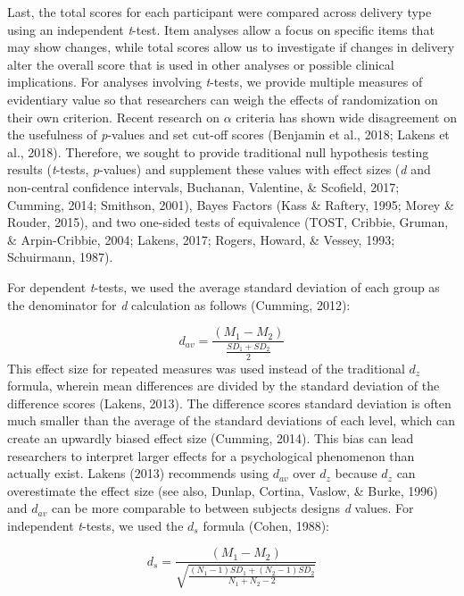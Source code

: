 \documentclass[english,man]{apa6}
\theoremstyle{definition}
\theoremstyle{definition}
\theoremstyle{definition}
\theoremstyle{remark}
\begin{document}
Last, the total scores for each participant were compared across
delivery type using an independent \emph{t}-test. Item analyses allow a
focus on specific items that may show changes, while total scores allow
us to investigate if changes in delivery alter the overall score that is
used in other analyses or possible clinical implications. For analyses
involving \emph{t}-tests, we provide multiple measures of evidentiary
value so that researchers can weigh the effects of randomization on
their own criterion. Recent research on \(\alpha\) criteria has shown
wide disagreement on the usefulness of \emph{p}-values and set cut-off
scores (Benjamin et al., 2018; Lakens et al., 2018). Therefore, we
sought to provide traditional null hypothesis testing results
(\emph{t}-tests, \emph{p}-values) and supplement these values with
effect sizes (\emph{d} and non-central confidence intervals, Buchanan,
Valentine, \& Scofield, 2017; Cumming, 2014; Smithson, 2001), Bayes
Factors (Kass \& Raftery, 1995; Morey \& Rouder, 2015), and two
one-sided tests of equivalence (TOST, Cribbie, Gruman, \& Arpin-Cribbie,
2004; Lakens, 2017; Rogers, Howard, \& Vessey, 1993; Schuirmann, 1987).

For dependent \emph{t}-tests, we used the average standard deviation of
each group as the denominator for \emph{d} calculation as follows
(Cumming, 2012):

\[
d_{av} = \frac {(M_1 -  M_2) } { \frac{SD_1 + SD_2 } {2} }
\] This effect size for repeated measures was used instead of the
traditional \(d_z\) formula, wherein mean differences are divided by the
standard deviation of the difference scores (Lakens, 2013). The
difference scores standard deviation is often much smaller than the
average of the standard deviations of each level, which can create an
upwardly biased effect size (Cumming, 2014). This bias can lead
researchers to interpret larger effects for a psychological phenomenon
than actually exist. Lakens (2013) recommends using \(d_{av}\) over
\(d_z\) because \(d_z\) can overestimate the effect size (see also,
Dunlap, Cortina, Vaslow, \& Burke, 1996) and \(d_{av}\) can be more
comparable to between subjects designs \emph{d} values. For independent
\emph{t}-tests, we used the \(d_s\) formula (Cohen, 1988):

\[
d_s = \frac {(M_1 -  M_2) } { \sqrt{\frac{(N_1-1)SD_1 + (N_2-1)SD_2 } {N_1+N_2-2}} }
\]
\end{document}
